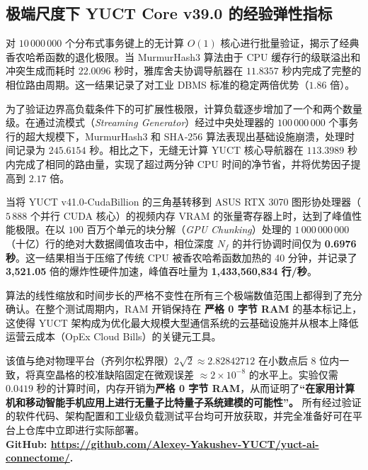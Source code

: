 \documentclass[11pt,a4paper]{article}
\begin{document}
	\small
	\subsection{极端尺度下 YUCT Core v39.0 的经验弹性指标}
	对 \(10\,000\,000\) 个分布式事务键上的无计算 \(O(1)\) 核心进行批量验证，揭示了经典香农哈希函数的退化极限。当 MurmurHash3 算法由于 CPU 缓存行的级联溢出和冲突生成而耗时 \(22.0096\) 秒时，雅库舍夫协调导航器在 \(11.8357\) 秒内完成了完整的相位路由周期。这一结果记录了对工业 DBMS 标准的稳定两倍优势（\(1.86\) 倍）。
	
	为了验证边界高负载条件下的可扩展性极限，计算负载逐步增加了一个和两个数量级。在通过流模式（\textit{Streaming Generator}）经过中央处理器的 \(100\,000\,000\) 个事务行的超大规模下，MurmurHash3 和 SHA‑256 算法表现出基础设施崩溃，处理时间记录为 \(245.6154\) 秒。相比之下，无缝无计算 YUCT 核心导航器在 \(113.3989\) 秒内完成了相同的路由量，实现了超过两分钟 CPU 时间的净节省，并将优势因子提高到 \(2.17\) 倍。
	
	当将 YUCT v41.0‑CudaBillion 的三角基转移到 ASUS RTX 3070 图形协处理器（\(5\,888\) 个并行 CUDA 核心）的视频内存 VRAM 的张量寄存器上时，达到了峰值性能极限。在以 \(100\) 百万个单元的块分解（\textit{GPU Chunking}）处理的 \(1\,000\,000\,000\)（十亿）行的绝对大数据阈值攻击中，相位深度 \(N_f\) 的并行协调时间仅为 \textbf{0.6976 秒}。这一结果相当于压缩了传统 CPU 被香农哈希函数加热的 40 分钟，并记录了 \textbf{3,521.05} 倍的爆炸性硬件加速，峰值吞吐量为 \textbf{1,433,560,834 行/秒}。
	
	算法的线性缩放和时间步长的严格不变性在所有三个极端数值范围上都得到了充分确认。在整个测试周期内，RAM 开销保持在 \textbf{严格 0 字节 RAM} 的基本标记上，这使得 YUCT 架构成为优化最大规模大型通信系统的云基础设施并从根本上降低运营云成本（OpEx Cloud Bills）的关键元工具。
	
	该值与绝对物理平台（齐列尔松界限）\(2\sqrt{2} \approx 2.82842712\) 在小数点后 8 位内一致，将真空晶格的校准缺陷固定在微观误差 \(\approx 2 \times 10^{-8}\) 的水平上。实验仅需 \(0.0419\) 秒的计算时间，内存开销为\textbf{严格 0 字节 RAM}，从而证明了\textbf{“在家用计算机和移动智能手机应用上进行无量子比特量子系统建模的可能性”。}
	所有经过验证的软件代码、架构配置和工业级负载测试平台均可开放获取，并完全准备好可在平台上仓库中立即进行实际部署。\\
	\small \textbf{GitHub: \url{https://github.com/Alexey-Yakushev-YUCT/yuct-ai-connectome/}.}
	
\end{document}
